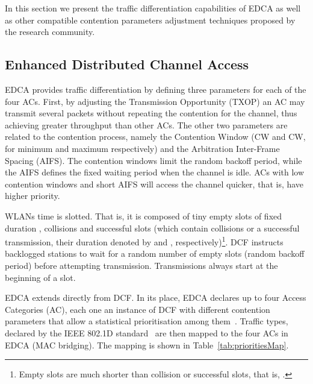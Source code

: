 \documentclass[a4paper]{article}
\begin{document}
In this section we present the traffic differentiation capabilities of EDCA as well as other compatible contention parameters adjustment techniques proposed by the research community.

\subsection{Enhanced Distributed Channel Access}\label{EDCA}
EDCA provides traffic differentiation by defining three parameters for each of the four ACs. First, by adjusting the Transmission Opportunity (TXOP) an AC may transmit several packets without repeating the contention for the channel, thus achieving greater throughput than other ACs. The other two parameters are related to the contention process, namely the Contention Window (CW and CW, for minimum and maximum respectively) and the Arbitration Inter-Frame Spacing (AIFS). The contention windows limit the random backoff period, while the AIFS defines the fixed waiting period when the channel is idle. ACs with low contention windows and short AIFS will access the channel quicker, that is, have higher priority.

WLANs time is slotted. That is, it is composed of tiny empty slots of fixed duration , collisions and successful slots (which contain collisions or a successful transmission, their duration denoted by  and , respectively)\footnote{Empty slots are much shorter than collision or successful slots, that is, .}. DCF instructs backlogged stations to wait for a random number of empty slots (random backoff period) before attempting transmission. Transmissions always start at the beginning of a slot.

EDCA extends directly from DCF. In its place, EDCA declares up to four Access Categories (AC), each one an instance of DCF with different contention parameters that allow a statistical prioritisation among them~\cite{perahia2013next}. Traffic types, declared by the IEEE 802.1D standard~\cite{8021d} are then mapped to the four ACs in EDCA (MAC bridging). The mapping is shown in Table~\ref{tab:prioritiesMap}.
\end{document}

